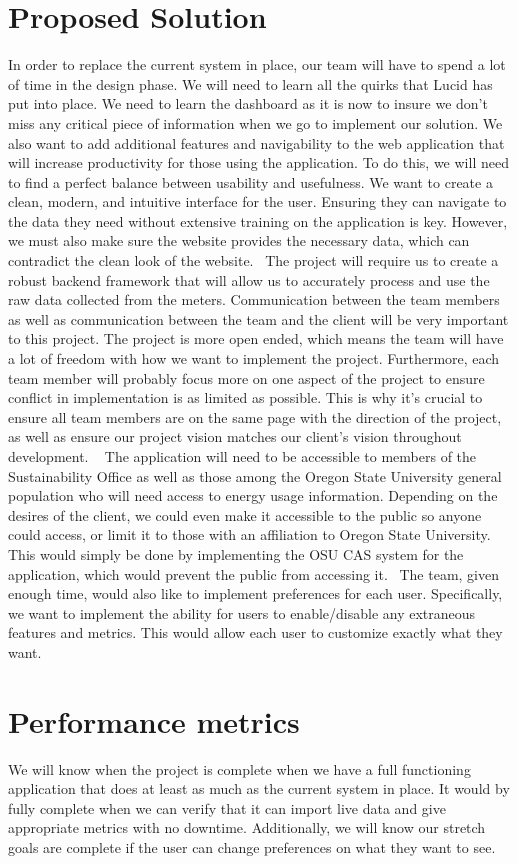 \documentclass[draftclsnofoot,onecolumn,10pt]{IEEEtran}
\begin{document}
\newpage
\section{Proposed Solution}
In order to replace the current system in place, our team will have to spend a lot of time in the design phase. We will need to learn all the quirks that Lucid has put into place. We need to learn the dashboard as it is now to insure we don’t miss any critical piece of information when we go to implement our solution. We also want to add additional features and navigability to the web application that will increase productivity for those using the application. To do this, we will need to find a perfect balance between usability and usefulness. We want to create a clean, modern, and intuitive interface for the user. Ensuring they can navigate to the data they need without extensive training on the application is key. However, we must also make sure the website provides the necessary data, which can contradict the clean look of the website.\ \smallbreak
The project will require us to create a robust backend framework that will allow us to accurately process and use the raw data collected from the meters. Communication between the team members as well as communication between the team and the client will be very important to this project. The project is more open ended, which means the team will have a lot of freedom with how we want to implement the project. Furthermore, each team member will probably focus more on one aspect of the project to ensure conflict in implementation is as limited as possible.  This is why it’s crucial to ensure all team members are on the same page with the direction of the project, as well as ensure our project vision matches our client's vision throughout development.  \ \smallbreak
The application will need to be accessible to members of the Sustainability Office as well as those among the Oregon State University general population who will need access to energy usage information. Depending on the desires of the client, we could even make it accessible to the public so anyone could access, or limit it to those with an affiliation to Oregon State University. This would simply be done by implementing the OSU CAS system for the application, which would prevent the public from accessing it.\ \smallbreak
The team, given enough time, would also like to implement preferences for each user. Specifically, we want to implement the ability for users to enable/disable any extraneous features and metrics. This would allow each user to customize exactly what they want.\\
\newpage
\section{Performance metrics}
We will know when the project is complete when we have a full functioning application that does at least as much as the current system in place. It would by fully complete when we can verify that it can import live data and give appropriate metrics with no downtime. Additionally, we will know our stretch goals are complete if the user can change preferences on what they want to see.

\end{document}
